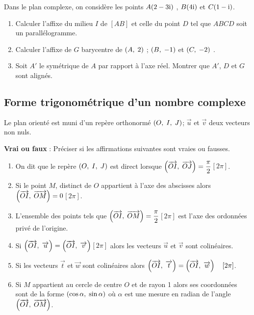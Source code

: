 \begin{exercice}
Dans le plan complexe, on considère les  points $ A(2-3\text{i}) $ , \; $ B(4\text{i}) $ et $ C(1-\text{i}) $.
\begin{enumerate}
\item Calculer l'affixe du milieu $ I $ de $ [AB] $ et celle du point $ D $ tel que   $ ABCD $ soit un parallélogramme.
\item Calculer l'affixe de $ G $ barycentre de  $ \left(A,\; 2\right) $ ;  $ \left(B,\; -1\right) $  et $ \left(C,\; -2\right) $ .
\item Soit $ A'$ le symétrique de  $ A $ par rapport à l'axe réel. Montrer que $ A'$, $  D$ et  $  G $ sont alignés.
\end{enumerate}
\end{exercice}
\subsection{ Forme trigonométrique d'un  nombre complexe}
\begin{lemma}
Le plan orienté est muni d'un repère orthonormé   $ \left(O,\; I, \; J\right) $; \; $\overrightarrow{u} $ et $ \overrightarrow{v}$ deux vecteurs non nuls.

\medskip

\textbf{Vrai ou faux}\; : Préciser si les affirmations suivantes sont vraies ou fausses.
\begin{enumerate}
        \item On dit que le repère  $ \left(O,\; I, \; J\right) $ \; est direct  lorsque  $ \left( \overrightarrow{OI},\;\overrightarrow{OJ} \right)=\dfrac{\pi}{2} $\quad$ [2\pi] $.
        \item Si le point $ M $, distinct de $ O $ appartient à l'axe des abscisses alors  $ \left( \overrightarrow{OI},\;\overrightarrow{OM} \right)=0 $\quad$ [2\pi] $.
        \item L'ensemble des points tels que  $ \left( \overrightarrow{OI},\;\overrightarrow{OM} \right)=\dfrac{\pi}{2} $\quad$ [2\pi] $ est l'axe des ordonnées privé de l'origine.
        \item Si  $ \left( \overrightarrow{OI},\;\overrightarrow{u} \right)= \left( \overrightarrow{OI},\;\overrightarrow{v} \right)$\quad $ [2\pi] $ alors les vecteurs $ \overrightarrow{u}$ et $\overrightarrow{v} $ sont colinéaires.
        \item Si les vecteurs $ \overrightarrow{t}$ et $\overrightarrow{w} $ sont colinéaires alors    $ \left( \overrightarrow{OI},\;\overrightarrow{t} \right)= \left( \overrightarrow{OI},\;\overrightarrow{w} \right)\quad  [2\pi] $.
        \item Si $ M $ appartient au cercle de centre $ O $ et de rayon 1 alors ses coordonnées sont de la forme $ \left(\cos \alpha ,\; \sin \alpha\right) $ où $ \alpha $ est une mesure en radian de l'angle $ \left( \overrightarrow{OI},\;\overrightarrow{OM} \right) $.
        \end{enumerate}
        \end{lemma}
